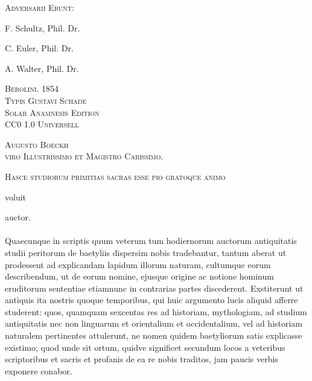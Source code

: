 \documentclass[a4paper, 11pt, oneside, polutonikogreek, german]{article}
\begin{document}
\begin{titlepage}
    \vfill
    {\footnotesize\scshape
    Adversarii Erunt:
    
    \bigskip

    F. Schultz, Phil. Dr.

    C. Euler, Phil. Dr.

    A. Walter, Phil. Dr.}    
    \vfill
    {\small\scshape Berolini. 1854}\\[0.2\baselineskip]
    {\small\scshape Typis Gustavi Schade}\\[0.5\baselineskip]

    {\scshape Solar Anamnesis Edition}\\[0.2\baselineskip]
    {\scshape\small CC0 1.0 Universell}
\end{titlepage}
\setlength{\parskip}{1mm plus1mm minus1mm}
\clearpage
\vspace*{\fill}
\begin{center}\scshape\large
Augusto Boeckh \\ viro Illustrissimo et Magistro Carissimo.
\end{center}

\bigskip

\begin{center}\scshape\large
Hasce studiorum primitias sacras esse pio gratoque animo

\bigskip

voluit

\bigskip

\hspace*{20mm}auctor.
\end{center}
\vspace*{\fill}
\clearpage
\paragraph{}
Quaecunque in scriptis quum veterum tum hodiernorum auctorum antiquitatis studii peritorum de baetyliis dispersim nobis tradebantur, tantum aberat ut prodessent ad explicandam lapidum illorum naturam, cultumque eorum describendum, ut de eorum nomine, ejusque origine ac notione hominum eruditorum sententiae etiamnunc in contrarias partes discederent. Exstiterunt ut antiquis ita nostris quoque temporibus, qui huic argumento lucis aliquid afferre studerent: quos, quamquam sexcentas res ad historiam, mythologiam, ad studium antiquitatis nec non linguarum et orientalium et occidentalium, vel ad historiam naturalem pertinentes attulerunt, ne nomen quidem baetyliorum satis explicasse existimo; quod unde sit ortum, quidve significet secundum locos a veteribus scriptoribus et sacris et profanis de ea re nobis traditos, jam paucis verbis exponere conabor.
\end{document}
